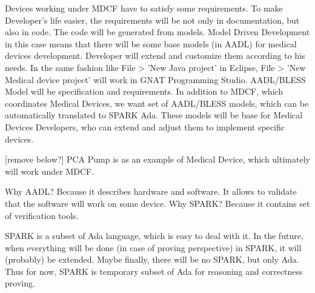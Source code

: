 Devices working under MDCF have to satisfy some requirements. To make Developer's life easier, the requirements will be not only in documentation, but also in code. The code will be generated from models.
Model Driven Development in this case means that there will be some base models (in AADL) for medical devices development. Developer will extend and customize them according to his needs. In the same fashion like File > 'New Java project' in Eclipse, File > 'New Medical device project' will work in GNAT Programming Studio. AADL/BLESS Model will be specification and requirements. In addition to MDCF, which coordinates Medical Devices, we want set of AADL/BLESS models, which can be automatically translated to SPARK Ada. These models will be base for Medical Devices Developers, who can extend and adjust them to implement specific devices. 

[remove below?]
PCA Pump is as an example of Medical Device, which ultimately will work under MDCF.

Why AADL? Because it describes hardware and software. It allows to validate that the software will work on some device.
Why SPARK? Because it contains set of verification tools. 

SPARK is a subset of Ada language, which is easy to deal with it. In the future, when everything will be done (in case of proving perspective) in SPARK, it will (probably) be extended. Maybe finally, there will be no SPARK, but only Ada. Thus for now, SPARK is temporary subset of Ada for reasoning and correctness proving.


